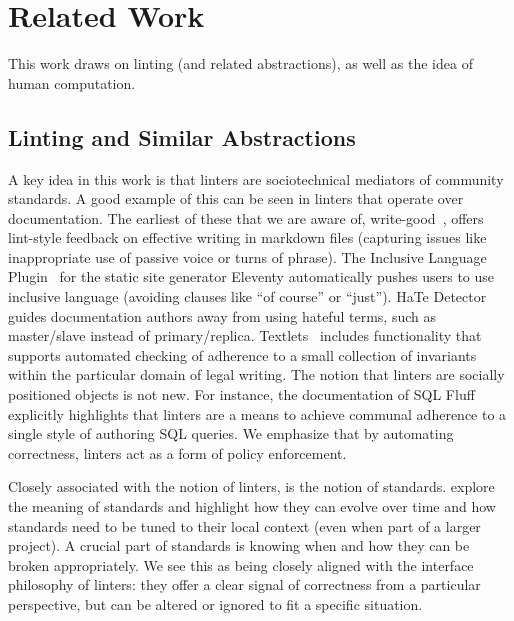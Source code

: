 \section{Related Work}
This work draws on linting (and related abstractions), as well as the idea of human computation.


\subsection{Linting and Similar Abstractions}

A key idea in this work is that linters are sociotechnical mediators of  community standards.
A good example of this can be seen in linters that operate over documentation.
The earliest of these that we are aware of, write-good~\cite{writeGood19Ford}, offers lint-style feedback on effective writing in markdown files (capturing issues like inappropriate use of passive voice or turns of phrase).
The Inclusive Language Plugin~\cite{elevntyInclsuiveLanguage} for the static site generator Eleventy automatically pushes users to use inclusive language (avoiding clauses like ``of course'' or ``just'').
HaTe Detector~\cite{winchester2023hate} guides documentation authors away from using hateful terms, such as master/slave instead of primary/replica.
Textlets~\cite{han2020textlets} includes functionality that supports automated checking of adherence to a small collection of invariants within the particular domain of legal writing.
The notion that linters are socially positioned objects is not new. For instance, the documentation of SQL Fluff~\cite{Cruickshank23SQLFluff} explicitly highlights that linters are a means to achieve communal adherence to a single style of authoring SQL queries.
We emphasize that by automating correctness, linters act as a form of policy enforcement.









Closely associated with the notion of linters, is the notion of standards. \citet{jackson2015standards} explore the meaning of standards and highlight how they can evolve over time and how standards need to be tuned to their local context (even when part of a larger project). A crucial part of standards is knowing when and how they can be broken appropriately.
We see this as being closely aligned with the interface philosophy of linters: they offer a clear signal of correctness from a particular perspective, but can be altered or ignored to fit a specific situation.

